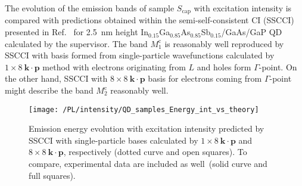 The evolution of the emission bands of sample $S_\mathrm{cap}$ with excitation intensity is compared with predictions obtained within the semi-self-consistent CI (SSCCI) presented in Ref.~\citep{Klenovsky2017} %
for 2.5~nm height In$_{0.15}$Ga$_{0.85}$As$_{0.85}$Sb$_{0.15}$/GaAs/GaP QD calculated by the supervisor. The band $M_1^\mathrm{c}$ is reasonably well reproduced by SSCCI with basis formed from single-particle wavefunctions calculated by $1\times8~\mathbf{k \cdot p}$ method with electrons originating from $L$ and holes form $\Gamma$-point. On the other hand, SSCCI with $8\times8~\mathbf{k \cdot p}$ basis for electrons coming from $\Gamma$-point might describe the band $M_2^\mathrm{c}$ reasonably well. {}
%
\begin{figure}
	\centering
	\texttt{[image: /PL/intensity/QD\_samples\_Energy\_int\_vs\_theory]}
	\caption{Emission energy evolution with excitation intensity predicted by SSCCI with single-particle bases calculated by $1\times8~\mathbf{k \cdot p}$ and $8\times8~\mathbf{k \cdot p}$, respectively (dotted curve and open squares). To compare, experimental data are included as well~(solid curve and full squares).}
	\label{fig:QD_cap_int_expvstheory}
\end{figure}

\newpage
